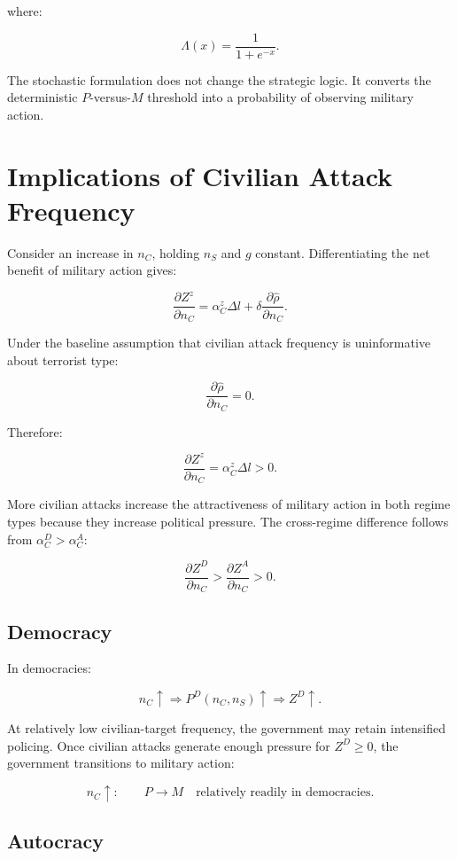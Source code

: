 \documentclass[
  letterpaper,
  DIV=11,
  numbers=noendperiod]{scrartcl}
\begin{document}
where:

\[
\Lambda(x)=\frac{1}{1+e^{-x}}.
\]

The stochastic formulation does not change the strategic logic. It
converts the deterministic \(P\)-versus-\(M\) threshold into a
probability of observing military action.

\section{Implications of Civilian Attack
Frequency}\label{implications-of-civilian-attack-frequency}

Consider an increase in \(n_C\), holding \(n_S\) and \(g\) constant.
Differentiating the net benefit of military action gives:

\[
\frac{\partial Z^z}{\partial n_C}
=
\alpha_C^z\Delta l
+\delta\frac{\partial\widehat{\rho}}{\partial n_C}.
\tag{22}
\]

Under the baseline assumption that civilian attack frequency is
uninformative about terrorist type:

\[
\frac{\partial\widehat{\rho}}{\partial n_C}=0.
\]

Therefore:

\[
\boxed{
\frac{\partial Z^z}{\partial n_C}
=
\alpha_C^z\Delta l>0.
}
\tag{23}
\]

More civilian attacks increase the attractiveness of military action in
both regime types because they increase political pressure. The
cross-regime difference follows from \(\alpha_C^D>\alpha_C^A\):

\[
\boxed{
\frac{\partial Z^D}{\partial n_C}
>
\frac{\partial Z^A}{\partial n_C}>0.
}
\tag{24}
\]

\subsection{Democracy}\label{democracy}

In democracies:

\[
n_C\uparrow
\Rightarrow
P^D(n_C,n_S)\uparrow
\Rightarrow
Z^D\uparrow.
\]

At relatively low civilian-target frequency, the government may retain
intensified policing. Once civilian attacks generate enough pressure for
\(Z^D\geq0\), the government transitions to military action:

\[
\boxed{
n_C\uparrow:
\qquad
P\longrightarrow M
\quad\text{relatively readily in democracies}.}
\]

\subsection{Autocracy}\label{autocracy}
\end{document}
